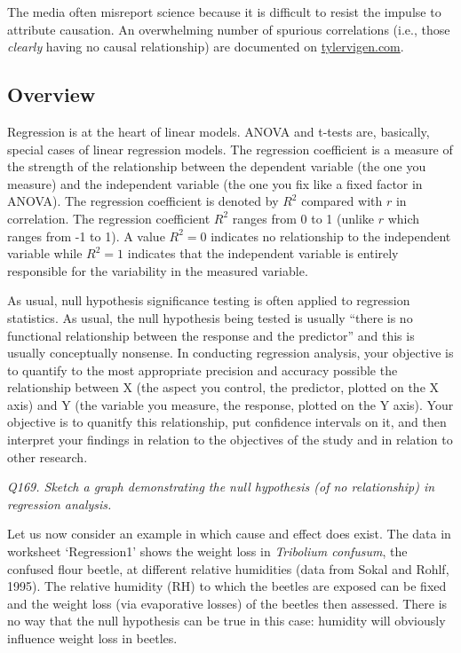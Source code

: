 \documentclass[
  11pt,
  a4paper,
]{book}
\begin{document}
The media often misreport science because it is difficult to resist the impulse to attribute causation. An overwhelming number of spurious correlations (i.e., those \emph{clearly} having no causal relationship) are documented on \href{https://tylervigen.com/spurious-correlations}{tylervigen.com}.

\hypertarget{overview-1}{%
\subsection{Overview}\label{overview-1}}

Regression is at the heart of linear models. ANOVA and t-tests are, basically, special cases of linear regression models. The regression coefficient is a measure of the strength of the relationship between the dependent variable (the one you measure) and the independent variable (the one you fix like a fixed factor in ANOVA). The regression coefficient is denoted by \(R^2\) compared with \(r\) in correlation. The regression coefficient \(R^2\) ranges from 0 to 1 (unlike \(r\) which ranges from -1 to 1). A value \(R^2 = 0\) indicates no relationship to the independent variable while \(R^2=1\) indicates that the independent variable is entirely responsible for the variability in the measured variable.

As usual, null hypothesis significance testing is often applied to regression statistics. As usual, the null hypothesis being tested is usually ``there is no functional relationship between the response and the predictor'' and this is usually conceptually nonsense. In conducting regression analysis, your objective is to quantify to the most appropriate precision and accuracy possible the relationship between X (the aspect you control, the predictor, plotted on the X axis) and Y (the variable you measure, the response, plotted on the Y axis). Your objective is to quanitfy this relationship, put confidence intervals on it, and then interpret your findings in relation to the objectives of the study and in relation to other research.

\emph{Q169. Sketch a graph demonstrating the null hypothesis (of no relationship) in regression analysis.}
\newline
\newline
\newline
\newline
\newline

Let us now consider an example in which cause and effect does exist. The data in worksheet `Regression1' shows the weight loss in \emph{Tribolium confusum}, the confused flour beetle, at different relative humidities (data from Sokal and Rohlf, 1995). The relative humidity (RH) to which the beetles are exposed can be fixed and the weight loss (via evaporative losses) of the beetles then assessed. There is no way that the null hypothesis can be true in this case: humidity will obviously influence weight loss in beetles.
\end{document}
